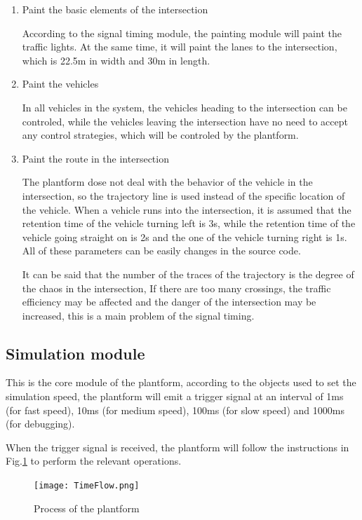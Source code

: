 \documentclass[a4paper]{paper}
\begin{document}
\begin{enumerate}
\item Paint the basic elements of the intersection

According to the signal timing module, the painting module will paint the traffic lights. At the same time, it will paint the lanes to the intersection, which is 22.5m in width and 30m in length.

\item Paint the vehicles

In all vehicles in the system, the vehicles heading to the intersection can be controled, while the vehicles leaving the intersection have no need to accept any control strategies, which will be controled by the plantform.

\item Paint the route in the intersection

The plantform dose not deal with the behavior of the vehicle in the intersection, so the trajectory line is used instead of the specific location of the vehicle. When a vehicle runs into the intersection, it is assumed that the retention time of the vehicle turning left is 3s, while the retention time of the vehicle going straight on is 2s and the one of the vehicle turning right is 1s. All of these parameters can be easily changes in the source code.

It can be said that the number of the traces of the trajectory is the degree of the chaos in the intersection, If there are too many crossings, the traffic efficiency may be affected and the danger of the intersection may be increased, this is a main problem of the signal timing.
\end{enumerate}

\subsection{Simulation module}
This is the core module of the plantform, according to the objects used to set the simulation speed, the plantform will emit a trigger signal at an interval of 1ms (for fast speed), 10ms (for medium speed), 100ms (for slow speed) and 1000ms (for debugging). 

When the trigger signal is received, the plantform will follow the instructions in Fig.\ref{int} to perform the relevant operations.

\begin{figure}
\centering
\texttt{[image: TimeFlow.png]}
\caption{Process of the plantform}
\label{int}
\end{figure}
\end{document}
